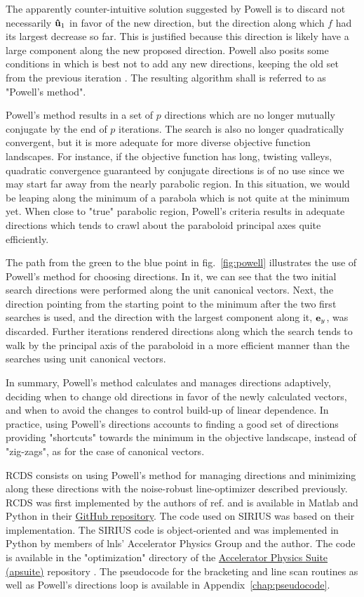 The apparently counter-intuitive solution suggested by Powell is to discard not necessarily $\vu{u}_1$ in favor of the new direction, but the direction along which $f$ had its largest decrease so far. This is justified because this direction is likely have a large component along the new proposed  direction. Powell also posits some conditions in which is best not to add any new directions, keeping the old set from the previous iteration \cite[section 10.7]{press_numerical_2007}. The resulting algorithm shall is referred to as "Powell's method".

Powell's method results in a set of $p$ directions which are no longer mutually conjugate by the end of $p$ iterations. The search is also no longer quadratically convergent, but it is more adequate for more diverse objective function landscapes. For instance, if the objective function has long, twisting valleys, quadratic convergence guaranteed by conjugate directions is of no use since we  may start far away from the nearly parabolic region. In this situation, we would be leaping along the minimum of a parabola which is not quite at the minimum yet. When close to "true" parabolic region, Powell's criteria results in adequate directions which tends to crawl about the paraboloid principal axes quite efficiently.

The path from the green to the blue point in fig.~\ref{fig:powell} illustrates the use of Powell's method for choosing directions. In it, we can see that the two initial search directions were performed along the unit canonical vectors. Next, the direction pointing from the starting point to the minimum after the two first searches is used, and the direction with the largest component along it, $\vb{e}_y$, was discarded. Further iterations rendered directions along which the search tends to walk by the principal axis of the paraboloid in a more efficient manner than the searches using unit canonical vectors.

In summary, Powell's method calculates and manages directions adaptively, deciding when to change old directions in favor of the newly calculated  vectors, and when to avoid the changes to control build-up of linear dependence. In practice, using Powell's directions accounts to finding a good set of directions providing "shortcuts" towards the minimum in the objective landscape, instead of "zig-zags", as for the case of canonical vectors.

\gls*{RCDS} consists on using Powell's method for managing directions and minimizing along these directions with the noise-robust line-optimizer described previously. \gls*{RCDS} was first implemented by the authors of ref.\cite{huang_algorithm_2013} and is available in Matlab and Python in their \href{https://github.com/SPEAR3-ML/RCDS}{GitHub repository}. The code used on SIRIUS was based on their implementation. The SIRIUS code is object-oriented and was  implemented in Python by members of \gls*{lnls}' Accelerator Physics Group and the author. The code is available in the "optimization" directory of the \href{https://github.com/lnls-fac/apsuite}{Accelerator Physics Suite (apsuite)} repository \cite{apsuite}. The pseudocode for the bracketing and line scan routines as well as Powell's directions loop is available in Appendix~\ref{chap:pseudocode}.
